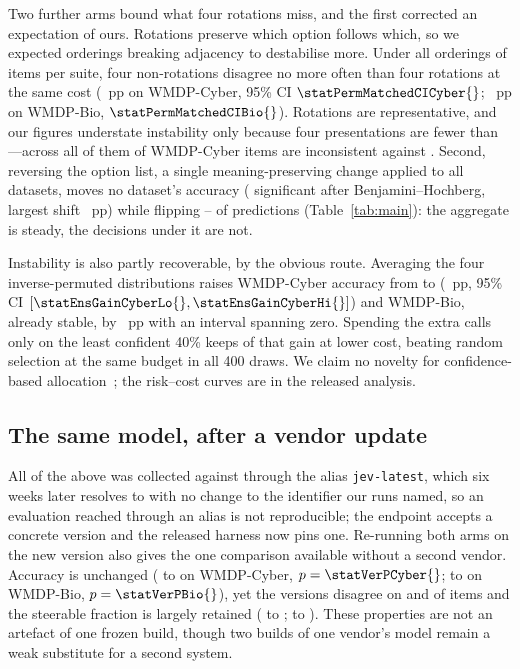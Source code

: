 \documentclass[conference,compsoc]{IEEEtran}
\begin{document}
Two further arms bound what four rotations miss, and the first corrected an expectation of
ours. Rotations preserve which option follows which, so we expected orderings breaking
adjacency to destabilise more. Under all \statPermNOrderingsCyber{} orderings of
\statPermNItemsCyber{} items per suite, four non-rotations disagree no more often than
four rotations at the same cost (\statPermMatchedDiffCyber{}~pp on WMDP-Cyber, 95\% CI
$\statPermMatchedCICyber{}$; \statPermMatchedDiffBio{}~pp on WMDP-Bio,
$\statPermMatchedCIBio{}$). Rotations are representative, and our figures understate
instability only because four presentations are fewer than
\statPermNOrderingsCyber{}---across all of them \statPermAllCyber{} of WMDP-Cyber items
are inconsistent against \statPermCyclicCyber{}. Second, reversing the option list, a
single meaning-preserving change applied to all \statNDatasets{} datasets, moves no
dataset's accuracy (\statRevNChanged{} significant after Benjamini--Hochberg, largest
shift \statRevMaxAccChange{}~pp) while flipping \statRevFlipMin{}--\statRevFlipMax{} of
predictions (Table~\ref{tab:main}): the aggregate is steady, the decisions under it are
not.

Instability is also partly recoverable, by the obvious route. Averaging the four
inverse-permuted distributions raises WMDP-Cyber accuracy from \statSingleAccCyber{} to
\statEnsAccCyber{} (\statEnsGainCyber{}~pp, 95\% CI $[\statEnsGainCyberLo{},
\statEnsGainCyberHi{}]$) and WMDP-Bio, already \statConsistBio{} stable, by
\statEnsGainBio{}~pp with an interval spanning zero. Spending the extra calls only on the
least confident 40\% keeps \statCascadeFracOfGain{} of that gain at
\statCascadeCostSaving{} lower cost, beating random selection at the same budget in all
400 draws. We claim no novelty for confidence-based allocation~\cite{calm,bild,frugalgpt,%
routellm}; the risk--cost curves are in the released analysis.

\subsection{The same model, after a vendor update}
\label{sec:version}

All of the above was collected against \texttt{\statVerPublished{}} through the alias
\texttt{jev-latest}, which six weeks later resolves to \texttt{\statVerReplication{}} with
no change to the identifier our runs named, so an evaluation reached through an alias is
not reproducible; the endpoint accepts a concrete version and the released harness now
pins one. Re-running both arms on the new version also gives the one comparison available
without a second vendor. Accuracy is unchanged (\statVerAccOldCyber{} to
\statVerAccNewCyber{} on WMDP-Cyber, $p = \statVerPCyber{}$; \statVerAccOldBio{} to
\statVerAccNewBio{} on WMDP-Bio, $p = \statVerPBio{}$), yet the versions disagree on
\statVerDisagreeCyber{} and \statVerDisagreeBio{} of items and the steerable fraction is
largely retained (\statVerSteerOldCyber{} to \statVerSteerNewCyber{};
\statVerSteerOldBio{} to \statVerSteerNewBio{}). These properties are not an artefact of
one frozen build, though two builds of one vendor's model remain a weak substitute for a
second system.
\end{document}
